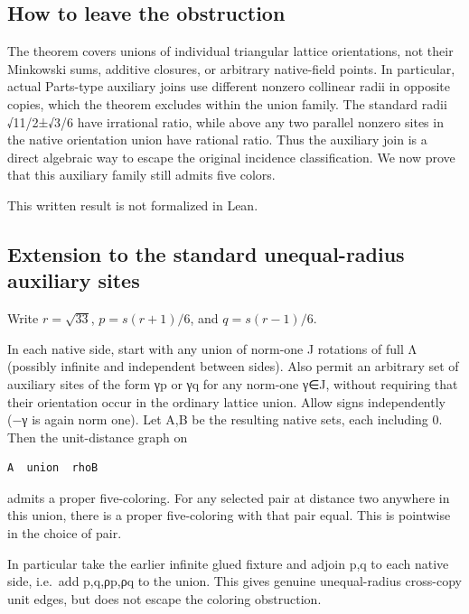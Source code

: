 \documentclass[
  11pt,
]{article}
\begin{document}
\subsection{How to leave the
obstruction}\label{how-to-leave-the-obstruction}

The theorem covers unions of individual triangular lattice orientations,
not their Minkowski sums, additive closures, or arbitrary native-field
points. In particular, actual Parts-type auxiliary joins use different
nonzero collinear radii in opposite copies, which the theorem excludes
within the union family. The standard radii √11/2±√3/6 have irrational
ratio, while above any two parallel nonzero sites in the native
orientation union have rational ratio. Thus the auxiliary join is a
direct algebraic way to escape the original incidence classification. We
now prove that this auxiliary family still admits five colors.

This written result is not formalized in Lean.

\subsection{Extension to the standard unequal-radius auxiliary
sites}\label{extension-to-the-standard-unequal-radius-auxiliary-sites}

Write \(r=\sqrt{33}\), \(p=s(r+1)/6\), and \(q=s(r-1)/6\).

In each native side, start with any union of norm-one J rotations of
full Λ (possibly infinite and independent between sides). Also permit an
arbitrary set of auxiliary sites of the form γp or γq for any norm-one
γ∈J, without requiring that their orientation occur in the ordinary
lattice union. Allow signs independently (−γ is again norm one). Let A,B
be the resulting native sets, each including 0. Then the unit-distance
graph on

\begin{verbatim}
A  union  rhoB
\end{verbatim}

admits a proper five-coloring. For any selected pair at distance two
anywhere in this union, there is a proper five-coloring with that pair
equal. This is pointwise in the choice of pair.

In particular take the earlier infinite glued fixture and adjoin p,q to
each native side, i.e.~add p,q,ρp,ρq to the union. This gives genuine
unequal-radius cross-copy unit edges, but does not escape the coloring
obstruction.
\end{document}
